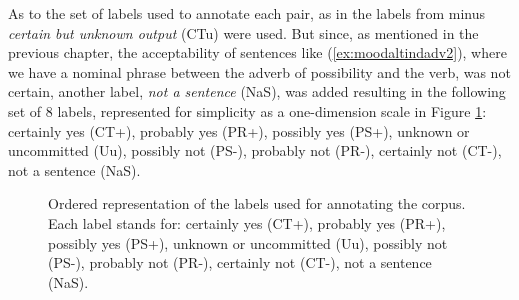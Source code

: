 \begin{exe}
  \label{ex:posbas}
  \label{ex:posind}
  \label{ex:possub}
\end{exe}

As to the set of labels used to annotate each pair, as in \citet{de2012did} the labels from \citet{sauri2009factbank} minus \textit{certain but unknown output} (CTu) were used. But since, as mentioned in the previous chapter, the acceptability of sentences like (\ref{ex:moodaltindadv2}), where we have a nominal phrase between the adverb of possibility and the verb, was not certain, another label, \textit{not a sentence} (NaS), was added resulting in the following set of 8 labels, represented for simplicity as a one-dimension scale in Figure \ref{fig:labels}: certainly yes (CT+), probably yes (PR+), possibly yes (PS+), unknown or uncommitted (Uu), possibly not (PS-), probably not (PR-), certainly not (CT-), not a sentence (NaS).\\

\begin{figure}
\centering
{} 
\caption[Ordered labels for the pilot study.]{Ordered representation of the labels used for annotating the corpus. Each label stands for: certainly yes (CT+), probably yes (PR+), possibly yes (PS+), unknown or uncommitted (Uu), possibly not (PS-), probably not (PR-), certainly not (CT-), not a sentence (NaS).}\label{fig:labels}
\end{figure}


